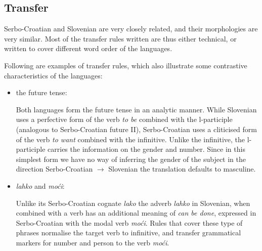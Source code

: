 
\subsection{Transfer}

Serbo-Croatian and Slovenian are very closely related, and their
morphologies are very similar. Most of the transfer rules written
are thus either technical, or written to cover different word order of
the languages.

Following are examples of transfer rules, which also illustrate some
contrastive characteristics of the languages:

\begin{itemize}
\item the future tense:

Both languages form the future tense in an analytic manner. While Slovenian
uses a perfective form of the verb \emph{to be} combined with the l-participle (analogous
to Serbo-Croatian future II), Serbo-Croatian uses a cliticised form of the verb \emph{to
  want} combined with the infinitive. Unlike the infinitive, the
l-participle carries the information on the gender and number. Since
in this simplest form we have no way of inferring the gender of the
subject in the direction Serbo-Croatian $\rightarrow$ Slovenian the translation defaults
to masculine.

\item \emph{lahko} and \emph{moći}:

Unlike its Serbo-Croatian cognate \emph{lako} the adverb \emph{lahko} in
Slovenian, when combined with a verb has an additional meaning of \emph{can be
  done}, expressed in Serbo-Croatian with the modal verb \emph{moći}. Rules that
cover these type of phrases normalise the target verb to infinitive,
and transfer grammatical markers for number and person to the verb \emph{moći}.


\end{itemize}
